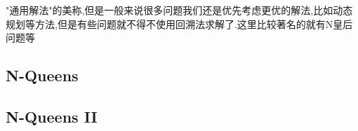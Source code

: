     
"通用解法"的美称,但是一般来说很多问题我们还是优先考虑更优的解法,比如动态规划等方法,但是有些问题就不得不使用回溯法求解了.这里比较著名的就有N皇后问题等

\subsection{N-Queens}

\subsection{N-Queens II}

